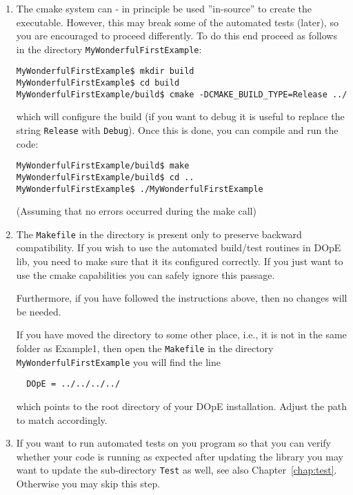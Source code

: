 \begin{enumerate}
\item The cmake system can - in principle be used
  ''in-source'' to create the executable. 
  However, this may break some of the automated tests (later),
  so you are encouraged to proceed differently. To do this end
  proceed as follows in the directory \texttt{MyWonderfulFirstExample}:
  \begin{verbatim}
MyWonderfulFirstExample$ mkdir build
MyWonderfulFirstExample$ cd build
MyWonderfulFirstExample/build$ cmake -DCMAKE_BUILD_TYPE=Release ../
\end{verbatim}
which will configure the build (if you want to debug it is useful to
replace the string \texttt{Release} with \texttt{Debug}). 
Once this is done, you can compile and run the code:
\begin{verbatim}
MyWonderfulFirstExample/build$ make 
MyWonderfulFirstExample/build$ cd ..
MyWonderfulFirstExample$ ./MyWonderfulFirstExample
\end{verbatim}
(Assuming that no errors occurred during the make call)

\item The \texttt{Makefile} in the directory is present only to
  preserve backward compatibility. If you wish to use the automated
  build/test routines in DOpE lib, you need to make sure that it its
  configured correctly. If you just want to use the cmake capabilities 
  you can safely ignore this passage.

  Furthermore, if you have followed the instructions above, then no
  changes will be needed.

  If you have moved the directory to some other place, i.e., it is not
  in the same folder as Example1, then open the \texttt{Makefile} 
  in the directory \texttt{MyWonderfulFirstExample}
  you will find the line 
  \begin{verbatim}
  DOpE = ../../../../
  \end{verbatim}
  which points to the root directory of your DOpE installation.
  Adjust the path to match accordingly.

\item If you want to run automated tests on you program so that you can 
  verify whether your code is running as expected after updating the 
  library you may want to update the sub-directory \texttt{Test} 
  as well, see also Chapter~\ref{chap:test}. Otherwise you may skip this 
  step.


\end{enumerate}
